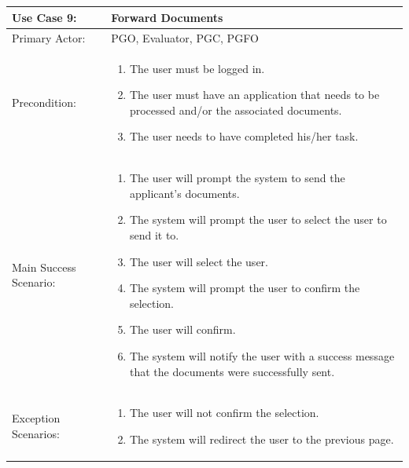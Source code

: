 \documentclass{article}
\begin{document}
\\ \\ \\ \\
\begin{tabular} {| m{5cm} | m{10cm} |}
\hline
Use Case 9: & Forward Documents \\
\hline
Primary Actor: & PGO, Evaluator, PGC, PGFO \\
\hline
Precondition: & \begin{enumerate} \itemsep0em \item The user must be logged in. 
\item The user must have an application that needs to be processed and/or the associated documents.
\item The user needs to have completed his/her task.
\end{enumerate} \\
\hline
Main Success Scenario: & \begin{enumerate} \itemsep0em \item The user will prompt the system to send the applicant's documents.
\item The system will prompt the user to select the user to send it to.
\item The user will select the user.
\item The system will prompt the user to confirm the selection.
\item The user will confirm.
\item The system will notify the user with a success message that the documents were successfully sent.
\end{enumerate}\\
\hline
Exception Scenarios: & \begin{enumerate} \itemsep0em \item The user will not confirm the selection.
\item The system will redirect the user to the previous page.
\end{enumerate} \\
\hline
\end{tabular}
\\ \\ \\ \\
\end{document}
